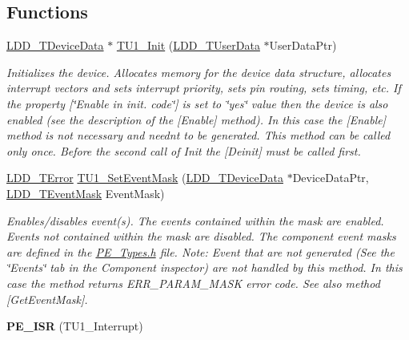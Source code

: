 \subsection*{Functions}
\begin{DoxyCompactItemize}
\item 
\hyperlink{group___p_e___types__module_gac5cf1362f1f0e3a2ce71b1bf2276d091}{L\+D\+D\+\_\+\+T\+Device\+Data} $\ast$ \hyperlink{group___t_u1__module_ga9bfbdf45fe9128c8d9e4245e3480d6da}{T\+U1\+\_\+\+Init} (\hyperlink{group___p_e___types__module_ga0b66a73f87238a782318aa0be7578e35}{L\+D\+D\+\_\+\+T\+User\+Data} $\ast$User\+Data\+Ptr)
\begin{DoxyCompactList}\small\item\em Initializes the device. Allocates memory for the device data structure, allocates interrupt vectors and sets interrupt priority, sets pin routing, sets timing, etc. If the property \mbox{[}\char`\"{}\+Enable in init. code\char`\"{}\mbox{]} is set to \char`\"{}yes\char`\"{} value then the device is also enabled (see the description of the \mbox{[}Enable\mbox{]} method). In this case the \mbox{[}Enable\mbox{]} method is not necessary and needn\textquotesingle{}t to be generated. This method can be called only once. Before the second call of Init the \mbox{[}Deinit\mbox{]} must be called first. \end{DoxyCompactList}\item 
\hyperlink{group___p_e___types__module_ga24c2b045fd04e79e85f261ce4df35588}{L\+D\+D\+\_\+\+T\+Error} \hyperlink{group___t_u1__module_ga0e3a03c2724bd7f8b64d8dd2c8796fd2}{T\+U1\+\_\+\+Set\+Event\+Mask} (\hyperlink{group___p_e___types__module_gac5cf1362f1f0e3a2ce71b1bf2276d091}{L\+D\+D\+\_\+\+T\+Device\+Data} $\ast$Device\+Data\+Ptr, \hyperlink{group___p_e___types__module_gafbe7f4d4e51560399c3bdd0218584533}{L\+D\+D\+\_\+\+T\+Event\+Mask} Event\+Mask)
\begin{DoxyCompactList}\small\item\em Enables/disables event(s). The events contained within the mask are enabled. Events not contained within the mask are disabled. The component event masks are defined in the \hyperlink{_p_e___types_8h}{P\+E\+\_\+\+Types.\+h} file. Note\+: Event that are not generated (See the \char`\"{}\+Events\char`\"{} tab in the Component inspector) are not handled by this method. In this case the method returns E\+R\+R\+\_\+\+P\+A\+R\+A\+M\+\_\+\+M\+A\+SK error code. See also method \mbox{[}Get\+Event\+Mask\mbox{]}. \end{DoxyCompactList}\item 
\mbox{\label{group___t_u1__module_gaa41b92c05e2ee5c591e4960928551eb0}} 
{\bfseries P\+E\+\_\+\+I\+SR} (T\+U1\+\_\+\+Interrupt)
\end{DoxyCompactItemize}



